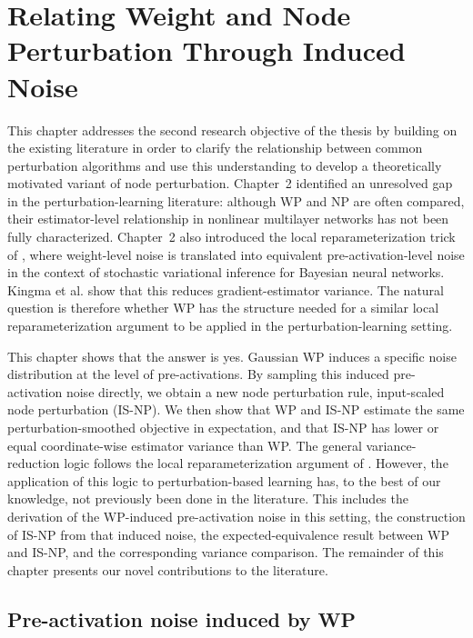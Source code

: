 \section{Relating Weight and Node Perturbation Through Induced Noise}
\label{ch:original_theoretical_contribution}

This chapter addresses the second research objective of the thesis by building on the existing literature in order to clarify the relationship between common perturbation algorithms and use this understanding to develop a theoretically motivated variant of node perturbation. Chapter~2 identified an unresolved gap in the perturbation-learning literature: although WP and NP are often compared, their estimator-level relationship in nonlinear multilayer networks has not been fully characterized. Chapter~2 also introduced the local reparameterization trick of \textcite{kingma_variational_2015}, where weight-level noise is translated into equivalent pre-activation-level noise in the context of stochastic variational inference for Bayesian neural networks. Kingma et al. show that this reduces gradient-estimator variance. The natural question is therefore whether WP has the structure needed for a similar local reparameterization argument to be applied in the perturbation-learning setting.

This chapter shows that the answer is yes. Gaussian WP induces a specific noise distribution at the level of pre-activations. By sampling this induced pre-activation noise directly, we obtain a new node perturbation rule, input-scaled node perturbation (IS-NP). We then show that WP and IS-NP estimate the same perturbation-smoothed objective in expectation, and that IS-NP has lower or equal coordinate-wise estimator variance than WP. The general variance-reduction logic follows the local reparameterization argument of \textcite{kingma_variational_2015}. However, the application of this logic to perturbation-based learning has, to the best of our knowledge, not previously been done in the literature. This includes the derivation of the WP-induced pre-activation noise in this setting, the construction of IS-NP from that induced noise, the expected-equivalence result between WP and IS-NP, and the corresponding variance comparison. The remainder of this chapter presents our novel contributions to the literature.
\subsection{Pre-activation noise induced by WP}
\label{sec:wp-induced-preactivation-noise}


